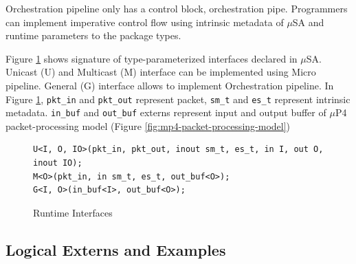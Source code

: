 \documentclass{hotnets19}
\begin{document}
Orchestration pipeline only has a control block, orchestration pipe.
Programmers can implement imperative control flow using intrinsic metadata of $\mu$SA and runtime parameters to the package types.

Figure \ref{fig:interfaces} shows signature of type-parameterized interfaces declared in $\mu$SA.
Unicast (U) and Multicast (M) interface can be implemented using Micro pipeline.
General (G) interface allows to implement Orchestration pipeline.
In Figure \ref{fig:interfaces}, \texttt{pkt\_in} and \texttt{pkt\_out} represent packet, \texttt{sm\_t} and \texttt{es\_t} represent intrinsic metadata.
\texttt{in\_buf} and \texttt{out\_buf} externs represent input and output buffer of $\mu$P4 packet-processing model (Figure \ref{fig:mp4-packet-processing-model})
\begin{figure}
\begin{lstlisting}[frame=none]
U<I, O, IO>(pkt_in, pkt_out, inout sm_t, es_t, in I, out O, inout IO); 
M<O>(pkt_in, in sm_t, es_t, out_buf<O>);
G<I, O>(in_buf<I>, out_buf<O>);
\end{lstlisting}
\caption{Runtime Interfaces}
\label{fig:interfaces}
\end{figure}

\subsection{Logical Externs and Examples}
% 
% 

\end{document}
